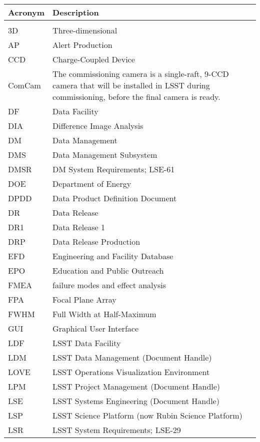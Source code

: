 \addtocounter{table}{-1}
\begin{longtable}{p{}p{}}\hline
\textbf{Acronym} & \textbf{Description}  \\\hline

 &  \\\hline
3D & Three-dimensional \\\hline
AP & Alert Production \\\hline
CCD & Charge-Coupled Device \\\hline
ComCam & The commissioning camera is a single-raft, 9-CCD camera that will be installed in LSST during commissioning, before the final camera is ready. \\\hline
DF & Data Facility \\\hline
DIA & Difference Image Analysis \\\hline
DM & Data Management \\\hline
DMS & Data Management Subsystem \\\hline
DMSR & DM System Requirements; LSE-61 \\\hline
DOE & Department of Energy \\\hline
DPDD & Data Product Definition Document \\\hline
DR & Data Release \\\hline
DR1 & Data Release 1 \\\hline
DRP & Data Release Production \\\hline
EFD & Engineering and Facility Database \\\hline
EPO & Education and Public Outreach \\\hline
FMEA & failure modes and effect analysis \\\hline
FPA & Focal Plane Array \\\hline
FWHM & Full Width at Half-Maximum \\\hline
GUI & Graphical User Interface \\\hline
LDF & LSST Data Facility \\\hline
LDM & LSST Data Management (Document Handle) \\\hline
LOVE & LSST Operations Visualization Environment \\\hline
LPM & LSST Project Management (Document Handle) \\\hline
LSE & LSST Systems Engineering (Document Handle) \\\hline
LSP & LSST Science Platform (now Rubin Science Platform) \\\hline
LSR & LSST System Requirements; LSE-29 \\\hline

\end{longtable}
